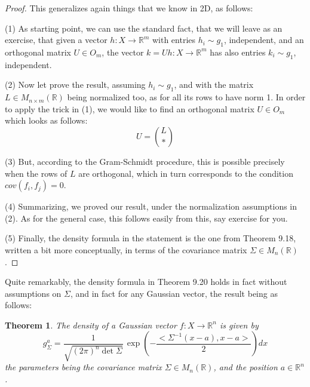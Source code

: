 \documentclass[12pt]{amsbook}
\newtheorem{theorem}{Theorem}[chapter]
\begin{document}
\begin{proof}
This generalizes again things that we know in 2D, as follows:

\medskip

(1) As starting point, we can use the standard fact, that we will leave as an exercise, that given a vector $h:X\to\mathbb R^m$ with entries $h_i\sim g_1$, independent, and an orthogonal matrix $U\in O_m$, the vector $k=Uh:X\to\mathbb R^m$ has also entries $k_i\sim g_1$, independent.

\medskip

(2) Now let prove the result, assuming $h_i\sim g_1$, and with the matrix $L\in M_{n\times m}(\mathbb R)$ being normalized too, as for all its rows to have norm 1. In order to apply the trick in (1), we would like to find an orthogonal matrix $U\in O_m$ which looks as follows:
$$U=\binom{L}{*}$$

(3) But, according to the Gram-Schmidt procedure, this is possible precisely when the rows of $L$ are orthogonal, which in turn corresponds to the condition $cov(f_i,f_j)=0$.

\medskip

(4) Summarizing, we proved our result, under the normalization assumptions in (2). As for the general case, this follows easily from this, say exercise for you.

\medskip

(5) Finally, the density formula in the statement is the one from Theorem 9.18, written a bit more conceptually, in terms of the covariance matrix $\Sigma\in M_n(\mathbb R)$.
\end{proof}

Quite remarkably, the density formula in Theorem 9.20 holds in fact without assumptions on $\Sigma$, and in fact for any Gaussian vector, the result being as follows:

\begin{theorem}
The density of a Gaussian vector $f:X\to\mathbb R^n$ is given by
$$g_\Sigma^a=\frac{1}{\sqrt{(2\pi)^n\det\Sigma}}\,\exp\left(-\frac{<\Sigma^{-1}(x-a),x-a>}{2}\right)dx$$
the parameters being the covariance matrix $\Sigma\in M_n(\mathbb R)$, and the position $a\in\mathbb R^n$.
\end{theorem}
\end{document}
